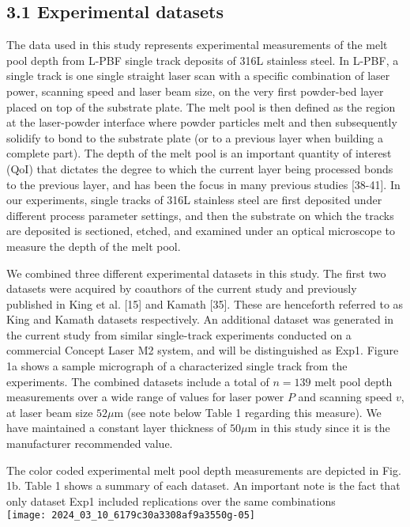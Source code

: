 \documentclass[10pt]{article}
\begin{document}
\subsection*{3.1 Experimental datasets}
The data used in this study represents experimental measurements of the melt pool depth from L-PBF single track deposits of 316L stainless steel. In L-PBF, a single track is one single straight laser scan with a specific combination of laser power, scanning speed and laser beam size, on the very first powder-bed layer placed on top of the substrate plate. The melt pool is then defined as the region at the laser-powder interface where powder particles melt and then subsequently solidify to bond to the substrate plate (or to a previous layer when building a complete part). The depth of the melt pool is an important quantity of interest (QoI) that dictates the degree to which the current layer being processed bonds to the previous layer, and has been the focus in many previous studies [38-41]. In our experiments, single tracks of 316L stainless steel are first deposited under different process parameter settings, and then the substrate on which the tracks are deposited is sectioned, etched, and examined under an optical microscope to measure the depth of the melt pool.

We combined three different experimental datasets in this study. The first two datasets were acquired by coauthors of the current study and previously published in King et al. [15] and Kamath [35]. These are henceforth referred to as King and Kamath datasets respectively. An additional dataset was generated in the current study from similar single-track experiments conducted on a commercial Concept Laser M2 system, and will be distinguished as Exp1. Figure 1a shows a sample micrograph of a characterized single track from the experiments. The combined datasets include a total of $n=139$ melt pool depth measurements over a wide range of values for laser power $P$ and scanning speed $v$, at laser beam size $52 \mu \mathrm{m}$ (see note below Table 1 regarding this measure). We have maintained a constant layer thickness of $50 \mu \mathrm{m}$ in this study since it is the manufacturer recommended value.

The color coded experimental melt pool depth measurements are depicted in Fig. 1b. Table 1 shows a summary of each dataset. An important note is the fact that only dataset Exp1 included replications over the same combinations\\
\texttt{[image: 2024\_03\_10\_6179c30a3308af9a3550g-05]}
\end{document}
